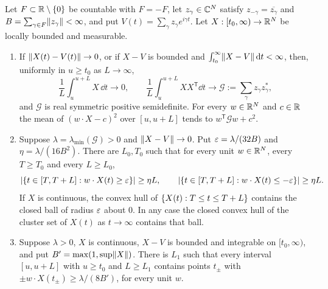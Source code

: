 \begin{lemma}\label{zer:lem:ap}
Let $F\subset\mathbb{R}\setminus\{0\}$ be countable with $F=-F$, let $z_\gamma\in\mathbb{C}^N$ satisfy
$z_{-\gamma}=\overline{z_\gamma}$ and $B=\sum_{\gamma\in F}\lVert z_\gamma\rVert<\infty$, and put
$V(t)=\sum_\gamma z_\gamma e^{i\gamma t}$. Let $X:[t_0,\infty)\to\mathbb{R}^N$ be locally bounded and
measurable.
\begin{enumerate}[label=\textup{(\roman*)}]
\item If $\lVert X(t)-V(t)\rVert\to0$, or if $X-V$ is bounded and $\int_{t_0}^\infty\lVert X-V\rVert\,\mathrm{d} t<\infty$,
then, uniformly in $u\ge t_0$ as $L\to\infty$,
\[
 \frac1L\int_u^{u+L}X\,\dd t\to0,\qquad
 \frac1L\int_u^{u+L}XX^{\mathsf T}\dd t\to\mathcal G:=\sum_\gamma z_\gamma z_\gamma^*,
\]
and $\mathcal G$ is real symmetric positive semidefinite. For every $w\in\mathbb{R}^N$ and $c\in\mathbb{R}$ the
mean of $(w\cdot X-c)^2$ over $[u,u+L]$ tends to $w^{\mathsf T}\mathcal Gw+c^2$.
\item Suppose $\lambda=\lambda_{\min}(\mathcal G)>0$ and $\lVert X-V\rVert\to0$. Put
$\varepsilon=\lambda/(32B)$ and $\eta=\lambda/(16B^2)$. There are $L_0,T_0$ such that for every
unit $w\in\mathbb{R}^N$, every $T\ge T_0$ and every $L\ge L_0$,
\[
 \lvert\{t\in[T,T+L]:w\cdot X(t)\ge\varepsilon\}\rvert\ge\eta L,\qquad
 \lvert\{t\in[T,T+L]:w\cdot X(t)\le-\varepsilon\}\rvert\ge\eta L .
\]
If $X$ is continuous, the convex hull of $\{X(t):T\le t\le T+L\}$ contains the closed ball
of radius $\varepsilon$ about $0$. In any case the closed convex hull of the cluster set of $X(t)$ as
$t\to\infty$ contains that ball.
\item Suppose $\lambda>0$, $X$ is continuous, $X-V$ is bounded and integrable on
$[t_0,\infty)$, and put $B'=\max(1,\sup\lVert X\rVert)$. There is $L_1$ such that every interval
$[u,u+L]$ with $u\ge t_0$ and $L\ge L_1$ contains points $t_\pm$ with
$\pm w\cdot X(t_\pm)\ge\lambda/(8B')$, for every unit $w$.
\end{enumerate}
\end{lemma}
